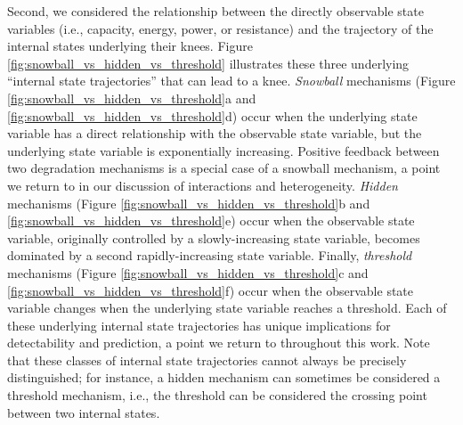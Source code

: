 \documentclass[journal=jpclcd,manuscript=article]{achemso}
\begin{document}
Second, we considered the relationship between the directly observable state variables (i.e., capacity, energy, power, or resistance) and the trajectory of the internal states underlying their knees. Figure \ref{fig:snowball_vs_hidden_vs_threshold} illustrates these three underlying ``internal state trajectories'' that can lead to a knee. \textit{Snowball} mechanisms (Figure \ref{fig:snowball_vs_hidden_vs_threshold}a and \ref{fig:snowball_vs_hidden_vs_threshold}d) occur when the underlying state variable has a direct relationship with the observable state variable, but the underlying state variable is exponentially increasing.
Positive feedback between two degradation mechanisms is a special case of a snowball mechanism, a point we return to in our discussion of interactions and heterogeneity.
\textit{Hidden} mechanisms (Figure \ref{fig:snowball_vs_hidden_vs_threshold}b and \ref{fig:snowball_vs_hidden_vs_threshold}e) occur when the observable state variable, originally controlled by a slowly-increasing state variable, becomes dominated by a second rapidly-increasing state variable. Finally, \textit{threshold} mechanisms (Figure \ref{fig:snowball_vs_hidden_vs_threshold}c and \ref{fig:snowball_vs_hidden_vs_threshold}f) occur when the observable state variable changes when the underlying state variable reaches a threshold. Each of these underlying internal state trajectories has unique implications for detectability and prediction, a point we return to throughout this work. Note that these classes of internal state trajectories cannot always be precisely distinguished; for instance, a hidden mechanism can sometimes be considered a threshold mechanism, i.e., the threshold can be considered the crossing point between two internal states.
\end{document}
